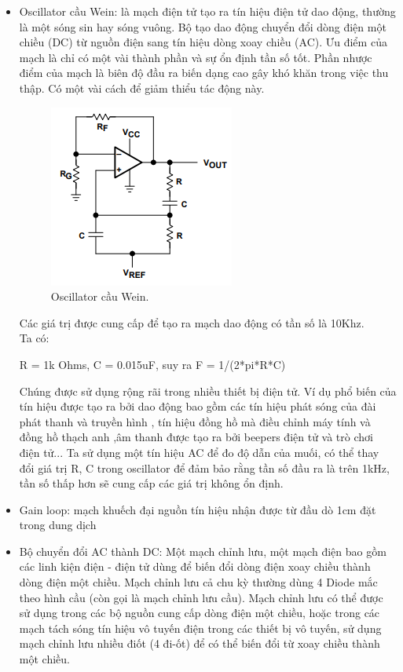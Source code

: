 \documentclass[a4paper,12pt,oneside]{article}
\begin{document}
\begin{itemize}
\item Oscillator cầu Wein: là mạch điện tử tạo ra tín hiệu điện tử dao động, thường là một sóng sin hay sóng vuông. Bộ tạo dao động chuyển đổi dòng điện một chiều (DC) từ nguồn điện sang tín hiệu dòng xoay chiều (AC). Ưu điểm của mạch là chỉ có một vài thành phần và sự ổn định tần số tốt. Phần nhược điểm của mạch là biên độ đầu ra biến dạng cao gây khó khăn trong việc thu thập. Có một vài cách để giảm thiểu tác động này.
\begin{figure}[H]
\centering
\begin{center}
\includegraphics[scale=1]{hinh/PPM/ppm_wein.png}
\end{center}
\caption{Oscillator cầu Wein.}
\end{figure}
Các giá trị được cung cấp để tạo ra mạch dao động có tần số là 10Khz.\\
Ta có:
\begin{center}
R = 1k Ohms, C = 0.015uF, suy ra F = 1/(2*pi*R*C)
\end{center}
Chúng được sử dụng rộng rãi trong nhiều thiết bị điện tử. Ví dụ phổ biến của tín hiệu được tạo ra bởi dao động bao gồm các tín hiệu phát sóng của đài phát thanh và truyền hình , tín hiệu đồng hồ mà điều chỉnh máy tính và đồng hồ thạch anh ,âm thanh được tạo ra bởi beepers điện tử và trò chơi điện tử... Ta sử dụng một tín hiệu AC để đo độ dẫn của muối, có thể thay đổi giá trị R, C trong oscillator để đảm bảo rằng tần số đầu ra là trên 1kHz, tần số thấp hơn sẽ cung cấp các giá trị không ổn định.
\item	Gain loop: mạch khuếch đại nguồn tín hiệu nhận được từ đầu dò 1cm đặt trong dung dịch
\item	Bộ chuyển đổi AC thành DC:  Một mạch chỉnh lưu, một mạch điện bao gồm các linh kiện điện - điện tử dùng để biến đổi dòng điện xoay chiều thành dòng điện một chiều. Mạch chỉnh lưu cả chu kỳ thường dùng 4 Diode mắc theo hình cầu (còn gọi là mạch chỉnh lưu cầu). Mạch chỉnh lưu có thể được sử dụng trong các bộ nguồn cung cấp dòng điện một chiều, hoặc trong các mạch tách sóng tín hiệu vô tuyến điện trong các thiết bị vô tuyến, sử dụng mạch chỉnh lưu nhiều điốt (4 đi-ốt) để có thể biến đổi từ xoay chiều thành một chiều.

\end{itemize}
\end{document}
